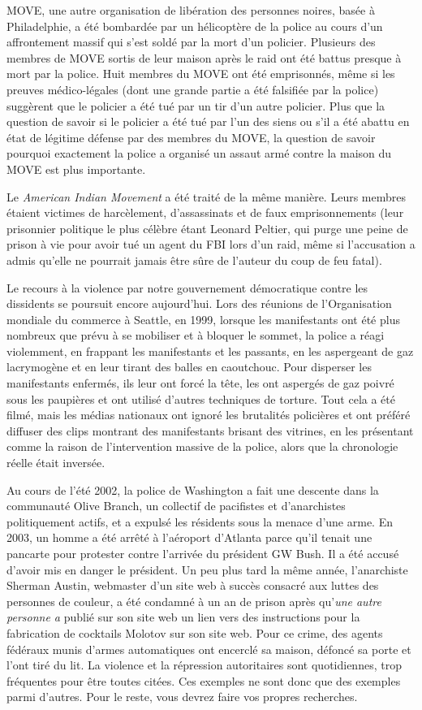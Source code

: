 MOVE, une autre organisation de libération des personnes noires, basée à Philadelphie, a été bombardée par un hélicoptère de la police au cours d'un affrontement massif qui s'est soldé par la mort d'un policier. Plusieurs des membres de MOVE sortis de leur maison après le raid ont été battus presque à mort par la police. Huit membres du MOVE ont été emprisonnés, même si les preuves médico-légales (dont une grande partie a été falsifiée par la police) suggèrent que le policier a été tué par un tir d’un autre policier. Plus que la question de savoir si le policier a été tué par l'un des siens ou s'il a été abattu en état de légitime défense par des membres du MOVE, la question de savoir pourquoi exactement la police a organisé un assaut armé contre la maison du MOVE est plus importante.

Le \emph{American Indian Movement} a été traité de la même manière. Leurs membres étaient victimes de harcèlement, d'assassinats et de faux emprisonnements (leur prisonnier politique le plus célèbre étant Leonard Peltier, qui purge une peine de prison à vie pour avoir tué un agent du FBI lors d'un raid, même si l'accusation a admis qu'elle ne pourrait jamais être sûre de l'auteur du coup de feu fatal).

Le recours à la violence par notre gouvernement démocratique contre les dissidents se poursuit encore aujourd'hui. Lors des réunions de l'Organisation mondiale du commerce à Seattle, en 1999, lorsque les manifestants ont été plus nombreux que prévu à se mobiliser et à bloquer le sommet, la police a réagi violemment, en frappant les manifestants et les passants, en les aspergeant de gaz lacrymogène et en leur tirant des balles en caoutchouc. Pour disperser les manifestants enfermés, ils leur ont forcé la tête, les ont aspergés de gaz poivré sous les paupières et ont utilisé d'autres techniques de torture. Tout cela a été filmé, mais les médias nationaux ont ignoré les brutalités policières et ont préféré diffuser des clips montrant des manifestants brisant des vitrines, en les présentant comme la raison de l'intervention massive de la police, alors que la chronologie réelle était inversée.

Au cours de l'été 2002, la police de Washington a fait une descente dans la communauté Olive Branch, un collectif de pacifistes et d'anarchistes politiquement actifs, et a expulsé les résidents sous la menace d'une arme. En 2003, un homme a été arrêté à l'aéroport d'Atlanta parce qu'il tenait une pancarte pour protester contre l'arrivée du président GW Bush. Il a été accusé d'avoir mis en danger le président. Un peu plus tard la même année, l'anarchiste Sherman Austin, webmaster d'un site web à succès consacré aux luttes des personnes de couleur, a été condamné à un an de prison après qu'\emph{une autre personne a} publié sur son site web un lien vers des instructions pour la fabrication de cocktails Molotov sur son site web. Pour ce crime, des agents fédéraux munis d'armes automatiques ont encerclé sa maison, défoncé sa porte et l'ont tiré du lit. La violence et la répression autoritaires sont quotidiennes, trop fréquentes pour être toutes citées. Ces exemples ne sont donc que des exemples parmi d'autres. Pour le reste, vous devrez faire vos propres recherches.

